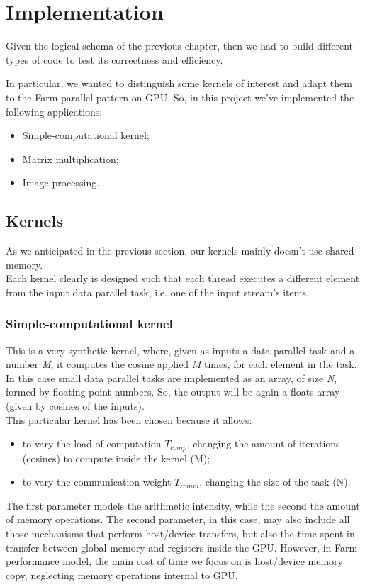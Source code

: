 \chapter{Implementation} 
\label{chap:impl}
Given the logical schema of the previous chapter, then we had to build different types of code to test its correctness and efficiency.

In particular, we wanted to distinguish some kernels of interest and adapt them to the Farm parallel pattern on GPU. So, in this project we've implemented the following applications:
\begin{itemize}
	\item Simple-computational kernel;
	\item Matrix multiplication;
	\item Image processing.
\end{itemize}

\section{Kernels}
As we anticipated in the previous section, our kernels mainly doesn't use shared memory.\\
Each kernel clearly is designed such that each thread executes a different element from the input data parallel task, i.e. one of the input stream's items.
\subsection{Simple-computational kernel}
	This is a very synthetic kernel, where, given as inputs a data parallel task and a number \textit{M}, it computes the cosine applied \textit{M} times, for each element in the task.
	In this case small data parallel tasks are implemented as an array, of size \textit{N}, formed by floating point numbers. So, the output will be again a floats array (given by cosines of the inputs).\\
	This particular kernel has been chosen because it allows:
	\begin{itemize}
		\item to vary the load of computation \(T_{comp}\), changing the amount of iterations (cosines) to compute inside the kernel (M);
		\item to vary the communication weight \(T_{comm}\), changing the size of the task (N).
	\end{itemize} 
	The first parameter models the arithmetic intensity, while the second the amount of memory operations.
	The second parameter, in this case, may also include all those mechanisms that perform host/device transfers, but also the time spent in transfer between global memory and registers inside the GPU.
	However, in Farm performance model, the main cost of time we focus on is host/device memory copy, neglecting memory operations internal to GPU.

